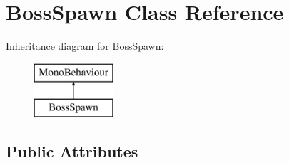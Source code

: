 \hypertarget{class_boss_spawn}{}\section{Boss\+Spawn Class Reference}
\label{class_boss_spawn}
Inheritance diagram for Boss\+Spawn\+:\begin{figure}[H]
\begin{center}
\leavevmode
\includegraphics[height=2.000000cm]{class_boss_spawn}
\end{center}
\end{figure}
\subsection*{Public Attributes}
